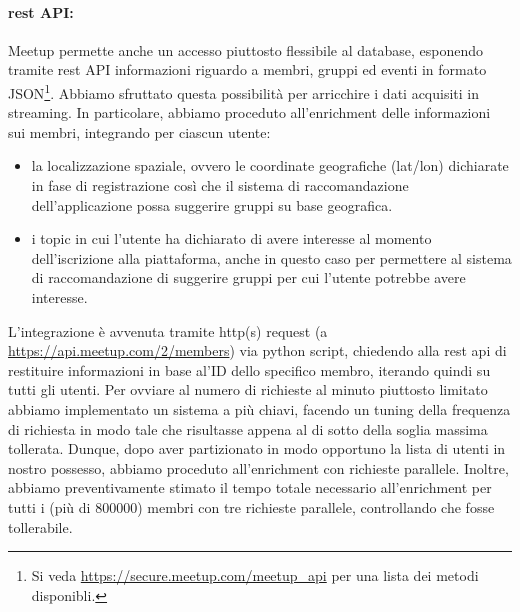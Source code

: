 \documentclass[fleqn,10pt]{SelfArx} %
\begin{document}
{\paragraph{rest API:} Meetup permette anche un accesso piuttosto flessibile al database, esponendo tramite rest API informazioni riguardo a membri, gruppi ed eventi in formato JSON\footnote{Si veda \url{https://secure.meetup.com/meetup_api} per una lista dei metodi disponibli.}. Abbiamo sfruttato questa possibilità per arricchire i dati acquisiti in streaming. In particolare, abbiamo proceduto all'enrichment delle informazioni sui membri, integrando per ciascun utente:
\begin{itemize}[noitemsep]
\item la localizzazione spaziale, ovvero le coordinate geografiche (lat/lon) dichiarate in fase di registrazione così che il sistema di raccomandazione dell'applicazione possa suggerire gruppi su base geografica.
\item i topic in cui l'utente ha dichiarato di avere interesse al momento dell'iscrizione alla piattaforma, anche in questo caso per permettere al sistema di raccomandazione di suggerire gruppi per cui l'utente potrebbe avere interesse.
\end{itemize}
L'integrazione è avvenuta tramite http(s) request (a \url{https://api.meetup.com/2/members}) via python script, chiedendo alla rest api di restituire informazioni in base al'ID dello specifico membro, iterando quindi su tutti gli utenti.
Per ovviare al numero di richieste al minuto piuttosto limitato abbiamo implementato un sistema a più chiavi, facendo un tuning della frequenza di richiesta in modo tale che risultasse appena al di sotto della soglia massima tollerata.
Dunque, dopo aver partizionato in modo opportuno la lista di utenti in nostro possesso, abbiamo proceduto all'enrichment con richieste parallele. 
Inoltre, abbiamo preventivamente stimato il tempo totale necessario all'enrichment per tutti i (più di $800000$) membri con tre richieste parallele, controllando che fosse tollerabile.
}
\end{document}
